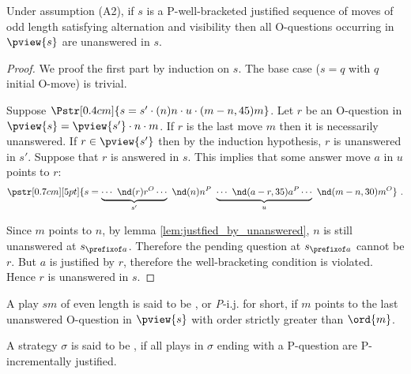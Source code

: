 \begin{lemma}
\label{lem:oq_in_pview_unanswered}
Under assumption (A2), if $s$ is a P-well-bracketed justified sequence of moves of odd length satisfying alternation and visibility then  all O-questions occurring in $\pview{s}$ are unanswered in $s$.
\end{lemma}
\begin{proof}
We proof the first part by induction on $s$.
The base case ($s = q$ with $q$ initial O-move) is trivial.

Suppose $\Pstr[0.4cm]{ s = s' \cdot (n)n \cdot u \cdot (m-n,45){m} }$.
Let $r$ be an O-question in $\pview{s} = \pview{s'} \cdot n \cdot m$.
If $r$ is the last move $m$ then it is necessarily unanswered.
If $r \in \pview{s'}$ then by the induction hypothesis, $r$ is unanswered in $s'$.
Suppose that $r$ is answered in $s$. This implies that some answer move $a$ in $u$ points to $r$:
$$\pstr[0.7cm][5pt]{ s = \underbrace{\cdots\ \nd(r){r}^O \cdots }_{s'} \
\nd(n){n}^P \ \underbrace{\cdots\ \nd(a-r,35){a}^P \cdots }_{u} \
\nd(m-n,30){m}^O } \ .$$
 
Since $m$ points to $n$, by lemma \ref{lem:justfied_by_unanswered}, $n$ is still unanswered at $s_{\prefixof a}$. Therefore the pending
question at $s_{\prefixof a}$ cannot be $r$. But $a$ is justified by $r$, therefore the well-bracketing condition is violated. Hence $r$ is
unanswered in $s$.
\end{proof}





\begin{definition}\rm
A play $s m$ of even length is said to be , or {\emph P-i.j.} for short, if $m$ points to the last unanswered O-question in $\pview{s}$ with order strictly greater than $\ord{m}$.

 A strategy $\sigma$ is said to be \defname{P-incrementally justified}, if all plays in $\sigma$ ending with a P-question are
P-incrementally justified.
\end{definition}

